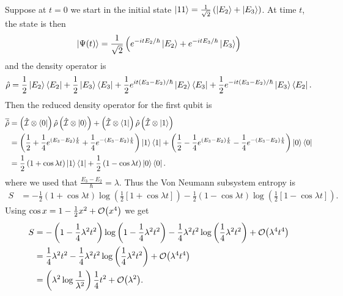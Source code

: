 Suppose at \(t=0\) we start in the initial state \(\left|11\right\rangle = \frac{1}{\sqrt{2}}\left(\left|E_2\right\rangle+\left|E_3\right\rangle\right)\). At time \(t\), the state is then
\[
\left|\Psi(t)\right\rangle = \frac{1}{\sqrt{2}}\left(e^{-itE_2/\hbar}\left|E_2\right\rangle + e^{-itE_3/\hbar} \left|E_3\right\rangle\right)
\]
and the density operator is
\[
\hat{\rho} = \frac{1}{2}\left|E_2\right\rangle\left\langle E_2\right| + \frac{1}{2}\left|E_3\right\rangle\left\langle E_3\right| + \frac{1}{2} e^{it\left(E_3-E_2\right)/\hbar} \left|E_2\right\rangle\left\langle E_3\right| + \frac{1}{2} e^{-it\left(E_3 - E_2\right)/\hbar} \left|E_3\right\rangle\left\langle E_2\right|.
\]
Then the reduced density operator for the first qubit is
\begin{align*}
\overline{\hat{\rho}} &= \left(\hat{\mathcal{I}}\otimes\left\langle0\right|\right) \hat{\rho} \left(\hat{\mathcal{I}}\otimes\left|0\right\rangle\right) + \left(\hat{\mathcal{I}}\otimes\left\langle1\right|\right) \hat{\rho} \left(\hat{\mathcal{I}}\otimes\left|1\right\rangle\right) \\
&= \left(\frac{1}{2} + \frac{1}{4}e^{\left(E_3-E_2\right)\frac{t}{\hbar}} + \frac{1}{4}e^{-\left(E_3-E_2\right)\frac{t}{\hbar}} \right)\left|1\right\rangle\left\langle1\right| + \left(\frac{1}{2} -\frac{1}{4}e^{\left(E_3-E_2\right)\frac{t}{\hbar}} -\frac{1}{4}e^{-\left(E_3-E_2\right)\frac{t}{\hbar}} \right)\left|0\right\rangle\left\langle0\right| \\
&= \frac{1}{2}\left(1 + \cos \lambda t \right)\left|1\right\rangle\left\langle1\right| + \frac{1}{2}\left(1 -\cos \lambda t \right)\left|0\right\rangle\left\langle0\right|.
\end{align*}
where we used that \(\frac{E_3-E_2}{\hbar} = \lambda\). Thus the Von Neumann subsystem entropy is
\begin{align*}
S &= -\frac{1}{2}\left(1 + \cos \lambda t \right)\log \left(\frac{1}{2}\left[1+\cos \lambda t\right]\right)
- \frac{1}{2}\left(1 - \cos \lambda t \right)\log \left(\frac{1}{2}\left[1-\cos\lambda t\right]\right).
\end{align*}
Using \(\cos x = 1-\frac{1}{2} x^2 + \mathcal{O}{\left(x^4\right)}\) we get
\begin{align*}
S &=- \left(1-\frac{1}{4}\lambda^2 t^2\right) \log \left(1-\frac{1}{4}\lambda^2 t^2\right) - \frac{1}{4}\lambda^2 t^2 \log \left(\frac{1}{4}\lambda^2 t^2\right) + \mathcal{O}{\left(\lambda^4 t^4\right)}\\
&=\frac{1}{4}\lambda^2 t^2 - \frac{1}{4}\lambda^2 t^2 \log \left(\frac{1}{4}\lambda^2 t^2\right) + \mathcal{O}{\left(\lambda^4 t^4\right)}\\
&= \left(\lambda^2 \log \frac{1}{\lambda^2}\right) \frac{1}{4} t^2 + \mathcal{O}{\left(\lambda^2\right)}.
\end{align*}

